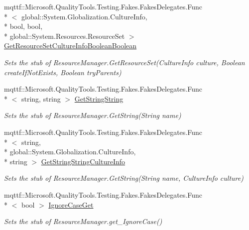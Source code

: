 \begin{DoxyCompactItemize}
mqttf\-::\-Microsoft.\-Quality\-Tools.\-Testing.\-Fakes.\-Fakes\-Delegates.\-Func\\*
$<$ global\-::\-System.\-Globalization.\-Culture\-Info, \\*
bool, bool, \\*
global\-::\-System.\-Resources.\-Resource\-Set $>$ \hyperlink{class_system_1_1_resources_1_1_fakes_1_1_stub_resource_manager_ae16e8e628ec488541f5b617cf31eb9e7}{Get\-Resource\-Set\-Culture\-Info\-Boolean\-Boolean}
\begin{DoxyCompactList}\small\item\em Sets the stub of Resource\-Manager.\-Get\-Resource\-Set(\-Culture\-Info culture, Boolean create\-If\-Not\-Exists, Boolean try\-Parents)\end{DoxyCompactList}\item 
mqttf\-::\-Microsoft.\-Quality\-Tools.\-Testing.\-Fakes.\-Fakes\-Delegates.\-Func\\*
$<$ string, string $>$ \hyperlink{class_system_1_1_resources_1_1_fakes_1_1_stub_resource_manager_ac26cc5dc427fdab0af5d1d23e2113516}{Get\-String\-String}
\begin{DoxyCompactList}\small\item\em Sets the stub of Resource\-Manager.\-Get\-String(\-String name)\end{DoxyCompactList}\item 
mqttf\-::\-Microsoft.\-Quality\-Tools.\-Testing.\-Fakes.\-Fakes\-Delegates.\-Func\\*
$<$ string, \\*
global\-::\-System.\-Globalization.\-Culture\-Info, \\*
string $>$ \hyperlink{class_system_1_1_resources_1_1_fakes_1_1_stub_resource_manager_a206981c7f870aa7a061dea40aa6bbab5}{Get\-String\-String\-Culture\-Info}
\begin{DoxyCompactList}\small\item\em Sets the stub of Resource\-Manager.\-Get\-String(\-String name, Culture\-Info culture)\end{DoxyCompactList}\item 
mqttf\-::\-Microsoft.\-Quality\-Tools.\-Testing.\-Fakes.\-Fakes\-Delegates.\-Func\\*
$<$ bool $>$ \hyperlink{class_system_1_1_resources_1_1_fakes_1_1_stub_resource_manager_a782b3de3fc3db31520aecc988d612305}{Ignore\-Case\-Get}
\begin{DoxyCompactList}\small\item\em Sets the stub of Resource\-Manager.\-get\-\_\-\-Ignore\-Case()\end{DoxyCompactList}\item 

\end{DoxyCompactItemize}
